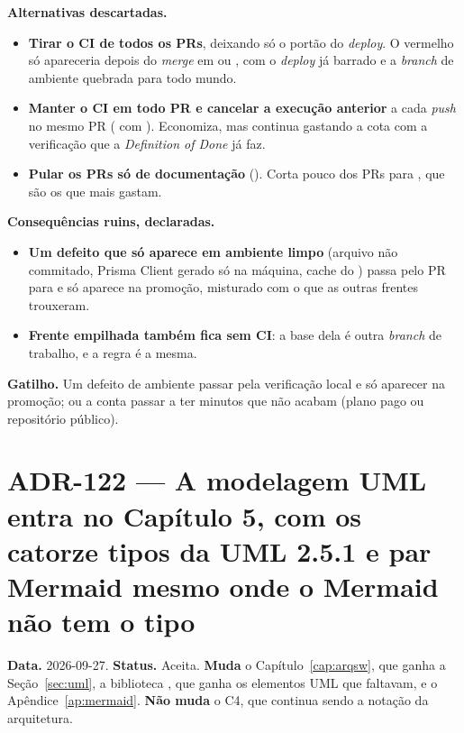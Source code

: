 \textbf{Alternativas descartadas.}

\begin{itemize}
  \item \textbf{Tirar o CI de todos os PRs}, deixando só o portão do
    \emph{deploy}. O vermelho só apareceria depois do \emph{merge} em 
    ou , com o \emph{deploy} já barrado e a \emph{branch} de ambiente
    quebrada para todo mundo.
  \item \textbf{Manter o CI em todo PR e cancelar a execução anterior} a cada
    \emph{push} no mesmo PR ( com ).
    Economiza, mas continua gastando a cota com a verificação que a
    \emph{Definition of Done} já faz.
  \item \textbf{Pular os PRs só de documentação} (). Corta
    pouco dos PRs para , que são os que mais gastam.
\end{itemize}

\textbf{Consequências ruins, declaradas.}

\begin{itemize}
  \item \textbf{Um defeito que só aparece em ambiente limpo} (arquivo não
    commitado, Prisma Client gerado só na máquina, cache do ) passa
    pelo PR para  e só aparece na promoção, misturado com o que
    as outras frentes trouxeram.
  \item \textbf{Frente empilhada também fica sem CI}: a base dela é outra
    \emph{branch} de trabalho, e a regra é a mesma.
\end{itemize}

\textbf{Gatilho.} Um defeito de ambiente passar pela verificação local e só
aparecer na promoção; ou a conta passar a ter minutos que não acabam (plano pago
ou repositório público).

\section{ADR-122 --- A modelagem UML entra no Capítulo 5, com os catorze tipos da UML 2.5.1 e par Mermaid mesmo onde o Mermaid não tem o tipo}
\label{adr:modelagem-uml}

\textbf{Data.} 2026-09-27. \textbf{Status.} Aceita.
\textbf{Muda} o Capítulo~\ref{cap:arqsw}, que ganha a Seção~\ref{sec:uml}, a
biblioteca , que ganha os elementos UML que faltavam,
e o Apêndice~\ref{ap:mermaid}. \textbf{Não muda} o C4, que continua sendo a notação
da arquitetura.

